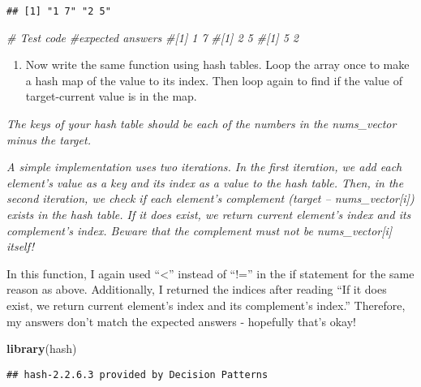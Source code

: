 \documentclass[
]{article}
\newenvironment{Shaded}{\begin{snugshade}}{\end{snugshade}}
\newcommand{\CommentTok}[1]{\textcolor[rgb]{0.56,0.35,0.01}{\textit{#1}}}
\newcommand{\FunctionTok}[1]{\textcolor[rgb]{0.13,0.29,0.53}{\textbf{#1}}}
\newcommand{\NormalTok}[1]{#1}
\providecommand{\tightlist}{%
  \setlength{\itemsep}{0pt}\setlength{\parskip}{0pt}}
\begin{document}
\begin{verbatim}
## [1] "1 7" "2 5"
\end{verbatim}

\begin{Shaded}
\begin{Highlighting}[]
\CommentTok{\# Test code}
\CommentTok{\#expected answers}
\CommentTok{\#[1] 1 7}
\CommentTok{\#[1] 2 5}
\CommentTok{\#[1] 5 2}
\end{Highlighting}
\end{Shaded}

\begin{enumerate}
\def\labelenumi{\arabic{enumi})}
\setcounter{enumi}{1}
\tightlist
\item
  Now write the same function using hash tables. Loop the array once to
  make a hash map of the value to its index. Then loop again to find if
  the value of target-current value is in the map.
\end{enumerate}

\emph{The keys of your hash table should be each of the numbers in the
nums\_vector minus the target. }

\emph{A simple implementation uses two iterations. In the first
iteration, we add each element's value as a key and its index as a value
to the hash table. Then, in the second iteration, we check if each
element's complement (target -- nums\_vector{[}i{]}) exists in the hash
table. If it does exist, we return current element's index and its
complement's index. Beware that the complement must not be
nums\_vector{[}i{]} itself!}

In this function, I again used ``\textless{}'' instead of ``!='' in the
if statement for the same reason as above. Additionally, I returned the
indices after reading ``If it does exist, we return current element's
index and its complement's index.'' Therefore, my answers don't match
the expected answers - hopefully that's okay!

\begin{Shaded}
\begin{Highlighting}[]
\FunctionTok{library}\NormalTok{(hash)}
\end{Highlighting}
\end{Shaded}

\begin{verbatim}
## hash-2.2.6.3 provided by Decision Patterns
\end{verbatim}
\end{document}
